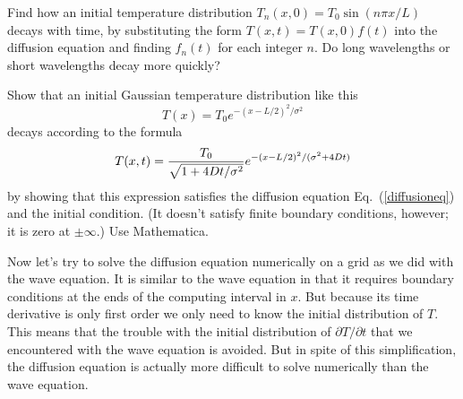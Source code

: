 \begin{enumerate}
\probtwo \label{P:17.1}
\begin{enumerate}
\subprob \label{P:17.1a} Find how an initial temperature
    distribution $T_n(x,0)=T_0 \sin{(n \pi x/L)}$ decays with
    time, by substituting the form $T(x,t) = T(x,0) f(t)$
    into the diffusion equation and finding $f_n(t)$ for each
    integer $n$. Do long wavelengths or short wavelengths
    decay more quickly?

\subprob \label{P:17.1b}


    Show that an initial Gaussian temperature distribution
    like this
    \begin{equation}
        T(x)=T_0 e^{-(x-L/2)^2/ \sigma^2}
    \end{equation}
    decays according to the formula
    \begin{equation}
        T(x,t)={T_0 \over \sqrt{1 + 4 D t / \sigma^2}}
        e^{-(x-L/2)^2/(\sigma^2 + 4 D t)}
    \label{diffgauss}
    \end{equation}
    by showing that this expression satisfies the diffusion
    equation Eq.~(\ref{diffusioneq}) and the initial
    condition. (It doesn't satisfy finite boundary
    conditions, however; it is zero at $\pm \infty$.) Use
    Mathematica.

%
\end{enumerate}
\end{enumerate}


Now let's try to solve the diffusion equation numerically on a grid
as we did with the wave equation. It is similar to the wave equation
in that it requires boundary conditions at the ends of the computing
interval in $x$. But because its time derivative is only first order
we only need to know the initial distribution of $T$. This means that
the trouble with the initial distribution of $\partial T/\partial t$
that we encountered with the wave equation is avoided. But in spite
of this simplification, the diffusion equation is actually more
difficult to solve numerically than the wave equation.

